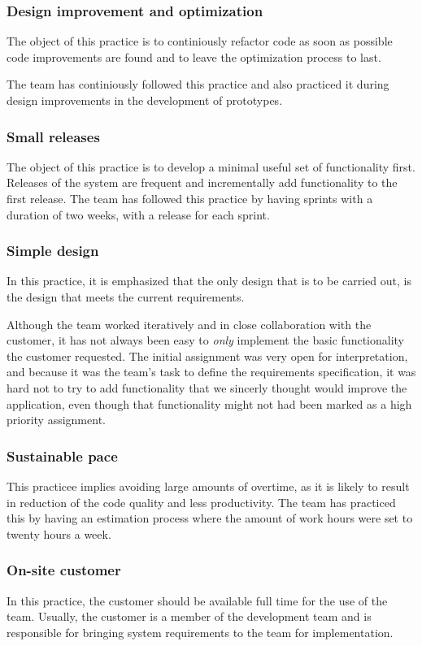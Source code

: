 \subsubsection{Design improvement and optimization}
The object of this practice is to continiously refactor code as soon as possible code improvements are found and to leave the optimization process to last. 

The team has continiously followed this practice and also practiced it during design improvements in the development of prototypes.
 
\subsubsection{Small releases}
The object of this practice is to develop a minimal useful set of functionality first. Releases of the system are frequent and incrementally add functionality to the first release. The team has followed this practice by having sprints with a duration of two weeks, with a release for each sprint.


\subsubsection{Simple design}
In this practice, it is emphasized that the only design that is to be carried out, is the design that meets the current requirements.

Although the team worked iteratively and in close collaboration with the customer, it has not always been easy to \emph{only} implement the basic functionality the customer requested. The initial assignment was very open for interpretation, and because it was the team's task to define the requirements specification, it was hard not to try to add functionality that we sincerly thought would improve the application, even though that functionality might not had been marked as a high priority assignment.


\subsubsection{Sustainable pace}
This practicee implies avoiding large amounts of overtime, as it is likely to result in reduction of the code quality and less productivity. The team has practiced this by having an estimation process where the amount of work hours were set to twenty hours a week.


\subsubsection{On-site customer}
In this practice, the customer should be available full time for the use of the team. Usually, the customer is a member of the development team and is responsible for bringing system requirements to the team for implementation.


